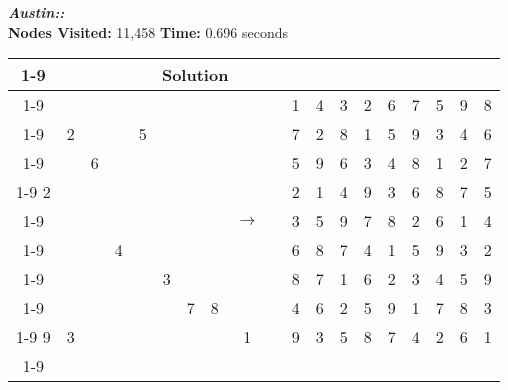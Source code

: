 \documentclass{article}
\begin{document}
\small\emph{\textbf{Austin::}}\\ \textbf{Nodes Visited:} 11,458 \textbf{Time:} 0.696 seconds\\
\begin{tabular}{||c|c|c||c|c|c||c|c|c|| c ||c|c|c||c|c|c||c|c|c||}
  \cmidrule{1-9} \cmidrule{11-19}
  \multicolumn{9}{|c|}{Problem} &                   & \multicolumn{9}{|c|}{Solution}   \\\cmidrule{1-9} \cmidrule{11-19} \morecmidrules \cmidrule{1-9} \cmidrule{11-19}
  &   &   &   &   &   &   &   &   & & 1 & 4 & 3 & 2 & 6 & 7 & 5 & 9 & 8 \\\cmidrule{1-9} \cmidrule{11-19} 
  & 2 &   &   & 5 &   &   &   &   & & 7 & 2 & 8 & 1 & 5 & 9 & 3 & 4 & 6\\\cmidrule{1-9} \cmidrule{11-19}
  &   & 6 &   &   &   &   &   &   & & 5 & 9 & 6 & 3 & 4 & 8 & 1 & 2 & 7\\\cmidrule{1-9} \cmidrule{11-19} \morecmidrules \cmidrule{1-9} \cmidrule{11-19}
2 &   &   &   &   &   &   &   &   & & 2 & 1 & 4 & 9 & 3 & 6 & 8 & 7 & 5\\\cmidrule{1-9} \cmidrule{11-19}
  &   &   &   &   &   &   &   & $\rightarrow$  & &  3 & 5 & 9 & 7 & 8 & 2 & 6 & 1 & 4\\\cmidrule{1-9} \cmidrule{11-19}
  &   &   & 4 &   &   &   &   &   & & 6 & 8 & 7 & 4 & 1 & 5 & 9 & 3 & 2\\\cmidrule{1-9} \cmidrule{11-19} \morecmidrules \cmidrule{1-9} \cmidrule{11-19}
  &   &   &   &   & 3 &   &   &   & & 8 & 7 & 1 & 6 & 2 & 3 & 4 & 5 & 9\\\cmidrule{1-9} \cmidrule{11-19}
  &   &   &   &   &   & 7 & 8 &   & & 4 & 6 & 2 & 5 & 9 & 1 & 7 & 8 & 3\\\cmidrule{1-9} \cmidrule{11-19}
9 & 3 &   &   &   &   &   &   & 1 & & 9 & 3 & 5 & 8 & 7 & 4 & 2 & 6 & 1\\\cmidrule{1-9} \cmidrule{11-19} \morecmidrules \cmidrule{1-9} \cmidrule{11-19}
 \end{tabular}
\\
\end{document}
